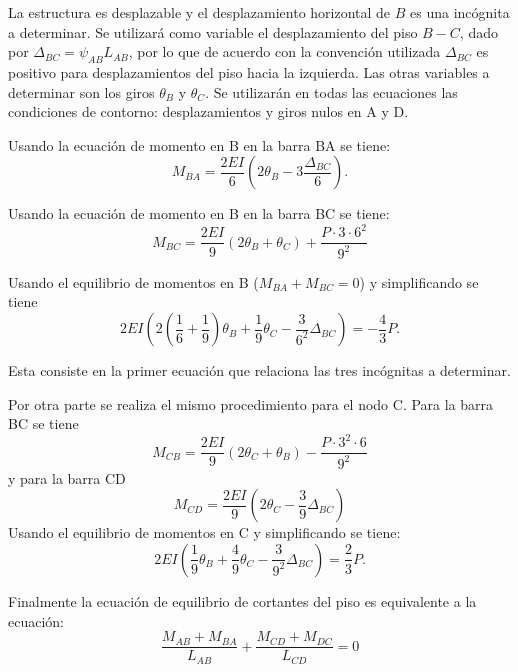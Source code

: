 La estructura es desplazable y el desplazamiento horizontal de $B$ es una incógnita a determinar. %
%
Se utilizará como variable el desplazamiento del piso $B-C$, dado por $\Delta_{BC} = \psi_{AB} L_{AB}$, por lo que de acuerdo con la convención utilizada $\Delta_{BC}$ es positivo para desplazamientos del piso hacia la izquierda.
Las otras variables a determinar son los giros $\theta_B$ y $\theta_C$. %
%
Se utilizarán en todas las ecuaciones las condiciones de contorno: desplazamientos y giros nulos en A y D.


Usando la ecuación de momento en B en la barra BA se tiene:
\begin{equation}
M_{BA} = \frac{2EI}{6} ( 2\theta_B - 3 \frac{ \Delta_{BC} } {6} ).
\end{equation}

Usando la ecuación de momento en B en la barra BC se tiene:
\begin{equation}
M_{BC} = \frac{2EI}{9} (2\theta_B +\theta_C ) + \frac{ P \cdot 3 \cdot 6^2}{9^2}
\end{equation}

Usando el equilibrio de momentos en B ($M_{BA}+M_{BC}=0$) y simplificando se tiene
\begin{equation}
\boxed{
	2EI \left( 2 \left( \frac{1}{6}+\frac{1}{9} \right) \theta_B + \frac{1}{9} \theta_C - \frac{3 }{6^2} \Delta_{BC} \right) = - \frac{4}{3} P.
}
\end{equation}

Esta consiste en la primer ecuación que relaciona las tres incógnitas a determinar.

Por otra parte se realiza el mismo procedimiento para el nodo C. Para la barra BC se tiene
\begin{equation}
M_{CB} = \frac{2EI}{9} (2\theta_C +\theta_B ) - \frac{P \cdot 3^2 \cdot 6}{9^2}
\end{equation}
y para la barra CD
\begin{equation}
M_{CD} = \frac{2EI}{9} (2\theta_C - \frac{3}{9} \Delta_{BC} )
\end{equation}
Usando el equilibrio de momentos en C y simplificando se tiene:
\begin{equation}
\boxed{
	2EI \left( \frac{1}{9} \theta_B + \frac{4}{9} \theta_C - \frac{3 }{9^2} \Delta_{BC} \right) = \frac{2}{3} P.
}
\end{equation}

Finalmente la ecuación de equilibrio de cortantes del piso es equivalente a la ecuación:
\begin{equation}
\frac{M_{AB}+M_{BA}}{L_{AB}}
+ 
\frac{M_{CD}+M_{DC}}{L_{CD}} = 0
\end{equation}


